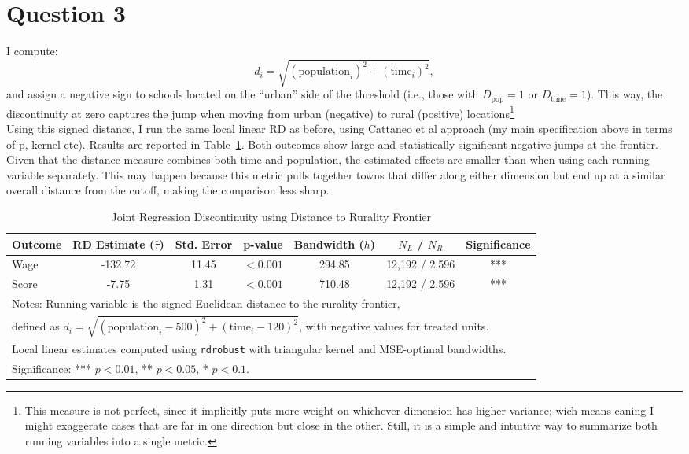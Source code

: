 \documentclass{article}
\begin{document}
\section*{Question 3}

I compute:
\[
d_i = \sqrt{(\text{population}_i)^2 + (\text{time}_i)^2},
\]
and assign a negative sign to schools located on the ``urban'' side of the threshold (i.e., those with $D_{\text{pop}}=1$ or $D_{\text{time}}=1$). This way, the discontinuity at zero captures the jump when moving from urban (negative) to rural (positive) locations\footnote{This measure is not perfect, since it implicitly puts more weight on whichever dimension has higher variance; wich means eaning I might exaggerate cases that are far in one direction but close in the other. Still, it is a simple and intuitive way to summarize both running variables into a single metric.} \\

Using this signed distance, I run the same local linear RD as before, using Cattaneo et al approach (my main specification above in terms of p, kernel etc). Results are reported in Table~\ref{tab:rd_rurality}. Both outcomes show large and statistically significant negative jumps at the frontier. Given that the distance measure combines both time and population, the estimated effects are smaller than when using each running variable separately. This may happen because this metric pulls together towns that differ along either dimension but end up at a similar overall distance from the cutoff, making the comparison less sharp. \\

\begin{table}[H]
\centering
\caption{Joint Regression Discontinuity using Distance to Rurality Frontier}
\label{tab:rd_rurality}
\begin{tabular}{lcccccc}
\hline
Outcome & RD Estimate ($\hat{\tau}$) & Std. Error & p-value & Bandwidth ($h$) & $N_L$ / $N_R$ & Significance \\
\hline
Wage  & -132.72 & 11.45 & $<0.001$ & 294.85 & 12,192 / 2,596 & *** \\
Score & -7.75   & 1.31  & $<0.001$ & 710.48 & 12,192 / 2,596 & *** \\
\hline
\multicolumn{7}{l}{\footnotesize Notes: Running variable is the signed Euclidean distance to the rurality frontier, }\\
\multicolumn{7}{l}{\footnotesize defined as $d_i = \sqrt{(\text{population}_i - 500)^2 + (\text{time}_i - 120)^2}$, with negative values for treated units.}\\
\multicolumn{7}{l}{\footnotesize Local linear estimates computed using \texttt{rdrobust} with triangular kernel and MSE-optimal bandwidths.}\\
\multicolumn{7}{l}{\footnotesize Significance: *** $p<0.01$, ** $p<0.05$, * $p<0.1$.}\\
\end{tabular}
\end{table}
\end{document}
